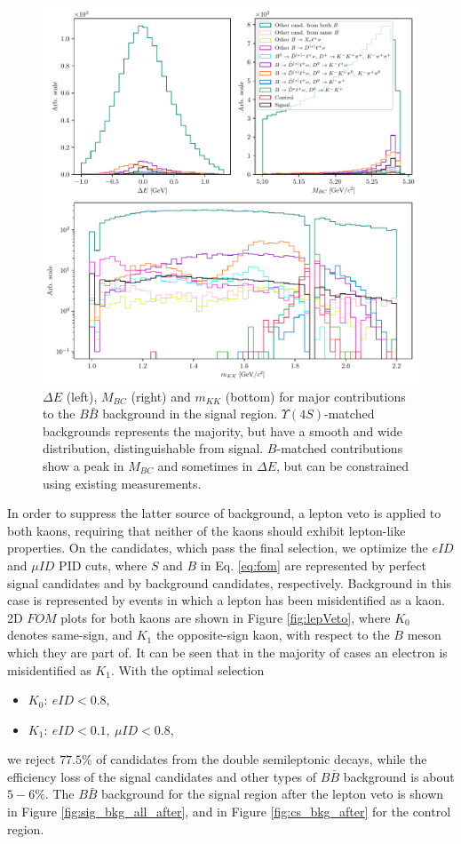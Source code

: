 \begin{figure}[H]
	\centering
	\captionsetup{width=0.8\linewidth}
	\includegraphics[width=\linewidth]{fig/sig_BKG_composition_all_before.pdf}
	\caption{$\Delta E$ (left), $M_{BC}$ (right) and $m_{KK}$ (bottom) for major contributions to the $B \bar B$ background in the signal region. $\Upsilon(4S)$-matched backgrounds represents the majority, but have a smooth and wide distribution, distinguishable from signal. $B$-matched contributions show a peak in $M_{BC}$ and sometimes in $\Delta E$, but can be constrained using existing measurements.}
	\label{fig:sig_bkg_all_before}
\end{figure} 

In order to suppress the latter source of background, a lepton veto is applied to both kaons, requiring that neither of the kaons should exhibit lepton-like properties. On the candidates, which pass the final selection, we optimize the $eID$ and $\mu ID$ PID cuts, where $S$ and $B$ in Eq. \ref{eq:fom} are represented by perfect signal candidates and by background candidates, respectively. Background in this case is represented by events in which a lepton has been misidentified as a kaon. 2D $FOM$ plots for both kaons are shown in Figure \ref{fig:lepVeto}, where $K_0$ denotes same-sign, and $K_1$ the opposite-sign kaon, with respect to the $B$ meson which they are part of. It can be seen that in the majority of cases an electron is misidentified as $K_1$. With the optimal selection 
\begin{itemize}
	\item $K_0:~eID < 0.8,$
	\item $K_1:~eID < 0.1,~\mu ID < 0.8,$
\end{itemize}
we reject $77.5\%$ of candidates from the double semileptonic decays, while the efficiency loss of the signal candidates and other types of $B \bar B$ background is about $5-6\%$. The $B \bar B$ background for the signal region after the lepton veto is shown in Figure \ref{fig:sig_bkg_all_after}, and in Figure \ref{fig:cs_bkg_after} for the control region.

